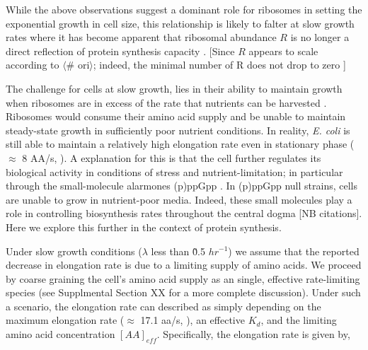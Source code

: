 While the above observations suggest a dominant role for ribosomes in
setting the exponential growth in cell size, this relationship is
likely to falter at slow growth rates where it has become apparent that ribosomal abundance  $R$
is no longer a direct reflection of protein synthesis capacity \citep{dai2016}.
[Since $R$ appears to scale according to $\langle$\# ori$\rangle$; indeed, the minimal number of R does
not drop to zero ]

The challenge for cells at slow growth, lies in their ability to maintain
growth when ribosomes are in excess of the rate that nutrients can be harvested
. Ribosomes would consume their amino acid
supply and be unable to maintain steady-state growth in sufficiently poor
nutrient conditions. In reality, \textit{E. coli} is still able to maintain a
relatively high elongation rate even in stationary phase ($\approx$ 8 AA/s,
\citep{dai2016, dai2018}). A explanation for this is that the cell further
regulates its biological activity in conditions of stress and
nutrient-limitation; in particular through the small-molecule alarmones (p)ppGpp
\citep{harris2018}. In (p)ppGpp null strains, cells are unable to grow in
nutrient-poor media. Indeed, these small molecules play a role in controlling
biosynthesis rates throughout the central dogma [NB citations]. Here we explore
this further in the context of protein synthesis.

Under slow growth conditions ($\lambda$ less than \~ 0.5 $hr^{-1}$) we assume
that the reported decrease in elongation rate is due to a limiting supply of
amino acids. We proceed by coarse graining the cell's amino acid supply as an
single, effective rate-limiting species (see Supplmental Section XX for a more
complete discussion). Under such a scenario, the elongation rate can described
as simply depending on the maximum elongation rate ($\approx$ 17.1 aa/s,
\citep{dai2016, dai2018}), an effective $K_d$, and the limiting amino acid
concentration $[AA]_{eff}$. Specifically, the elongation rate is given by,

